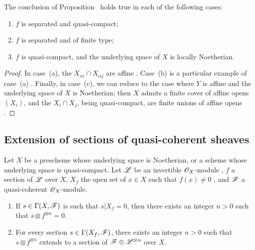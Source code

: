 \begin{cor}[9.2.2]
\label{1.9.2.2}
The conclusion of Proposition~ holds true in each of the following cases:
\begin{enumerate}[label=\emph{(\alph*)}]
  \item $f$ is separated and quasi-compact;
  \item $f$ is separated and of finite type;
  \item $f$ is quasi-compact, and the underlying space of $X$ is locally Noetherian.
\end{enumerate}
\end{cor}

\begin{proof}
\label{proof-1.9.2.2}
In case~(a), the $X_{\alpha i}\cap X_{\alpha j}$ are affine .
Case~(b) is a particular example of case~(a) . Finally, in case~(c), we can reduce to the case where $Y$ is affine and the underlying space of $X$ is Noetherian; then $X$ admits a finite cover of affine opens $(X_i)$, and the $X_i\cap X_j$, being quasi-compact, are finite unions of affine opens .
\end{proof}

\subsection{Extension of sections of quasi-coherent sheaves}
\label{subsection:extension-of-sections-of-qcoh}

\begin{thm}[9.3.1]
\label{1.9.3.1}
Let $X$ be a prescheme whose underlying space is Noetherian, or a scheme whose underlying
space is quasi-compact. Let $\mathscr{L}$ be an invertible $\mathscr{O}_X$-module , $f$ a
section of $\mathscr{L}$ over $X$, $X_f$ the open set of $x\in X$ such that $f(x)\neq0$
, and $\mathscr{F}$ a quasi-coherent $\mathscr{O}_X$-module.
\begin{enumerate}[label=\emph{(\roman*)}]
  \item If $s\in\Gamma(X,\mathscr{F})$ is such that $s|X_f=0$, then there exists an integer $n>0$ such that $s\otimes f^{\otimes n}=0$.
  \item For every section $s\in\Gamma(X_f,\mathscr{F})$, there exists an integer $n>0$ such that $s\otimes f^{\otimes n}$ extends to a section of $\mathscr{F}\otimes\mathscr{L}^{\otimes n}$ over $X$.
\end{enumerate}
\end{thm}

